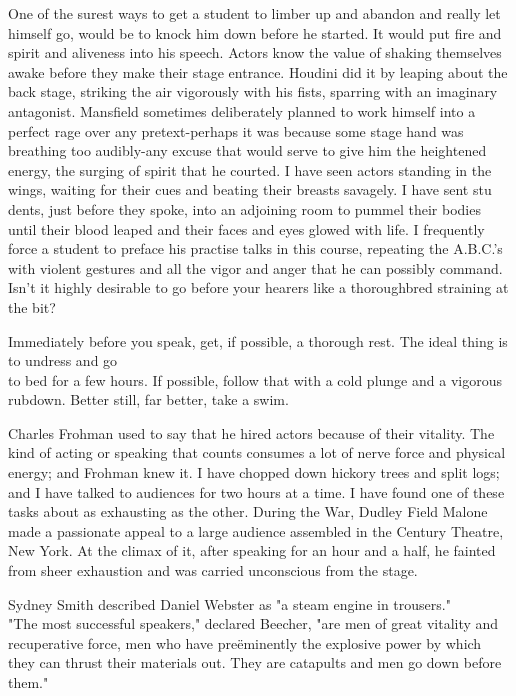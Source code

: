 \documentclass[10pt]{article}
\begin{document}
One of the surest ways to get a student to limber up and abandon and really let himself go, would be to knock him down before he started. It would put fire and spirit and aliveness into his speech. Actors know the value of shaking themselves awake before they make their stage entrance. Houdini did it by leaping about the back stage, striking the air vigorously with his fists, sparring with an imaginary antagonist. Mansfield sometimes deliberately planned to work himself into a perfect rage over any pretext-perhaps it was because some stage hand was breathing too audibly-any excuse that would serve to give him the heightened energy, the surging of spirit that he courted. I have seen actors standing in the wings, waiting for their cues and beating their breasts savagely. I have sent stu dents, just before they spoke, into an adjoining room to pummel their bodies until their blood leaped and their faces and eyes glowed with life. I frequently force a student to preface his practise talks in this course, repeating the A.B.C.'s with violent gestures and all the vigor and anger that he can possibly command. Isn't it highly desirable to go before your hearers like a thoroughbred straining at the bit?

Immediately before you speak, get, if possible, a thorough rest. The ideal thing is to undress and go\\
to bed for a few hours. If possible, follow that with a cold plunge and a vigorous rubdown. Better still, far better, take a swim.

Charles Frohman used to say that he hired actors because of their vitality. The kind of acting or speaking that counts consumes a lot of nerve force and physical energy; and Frohman knew it. I have chopped down hickory trees and split logs; and I have talked to audiences for two hours at a time. I have found one of these tasks about as exhausting as the other. During the War, Dudley Field Malone made a passionate appeal to a large audience assembled in the Century Theatre, New York. At the climax of it, after speaking for an hour and a half, he fainted from sheer exhaustion and was carried unconscious from the stage.

Sydney Smith described Daniel Webster as "a steam engine in trousers."\\
"The most successful speakers," declared Beecher, "are men of great vitality and recuperative force, men who have preëminently the explosive power by which they can thrust their materials out. They are catapults and men go down before them."
\end{document}
